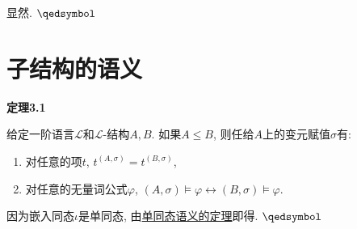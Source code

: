  显然. \hfill $\qedsymbol$

\vspace{20pt}





\section{子结构的语义}

\hypertarget{sec:定理3.1}{}
\noindent\textbf{定理3.1}

给定一阶语言$\mathcal{L}$和$\mathcal{L}$-结构$A,B$.
如果$A\leqslant B$, 则任给$A$上的变元赋值$\sigma$有:
\begin{enumerate}
    \item 对任意的项$t$, $t^{(A,\sigma)}=t^{(B,\sigma)}$,
    \item 对任意的无量词公式$\varphi$,
    $(A,\sigma)\models\varphi\leftrightarrow(B,\sigma)\models\varphi$.
\end{enumerate}


因为嵌入同态$\iota$是单同态, 由\href{02 结构的同态#nameddest=sec:定理3.3}
{单同态语义的定理}即得. \hfill $\qedsymbol$

